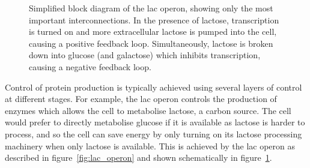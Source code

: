 \begin{figure}
  \centering
  \caption{Simplified block diagram of the lac operon, showing only the most
    important interconnections. 
    In the presence of lactose, transcription is turned on and more
    extracellular lactose is pumped into the cell, causing a positive feedback
    loop.
    Simultaneously, lactose is broken down into glucose (and galactose) which
    inhibits transcription, causing a negative feedback loop.
  }
  \label{fig:lac_block}
\end{figure}

Control of protein production is typically achieved using several layers of
control at different stages.
For example, the lac operon controls the production of enzymes which allows the
cell to metabolise lactose, a carbon source.
The cell would prefer to directly metabolise glucose if it is available as
lactose is harder to process, and so the cell can save energy by only turning
on its lactose processing machinery when only lactose is available.
This is achieved by the lac operon as described in figure~\ref{fig:lac_operon} 
and shown schematically in figure~\ref{fig:lac_block}.

